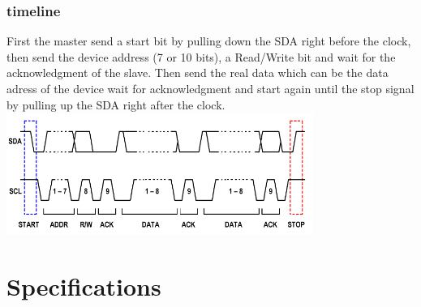 \documentclass[12pt,a4paper,landscape]{article}
\begin{document}
\begin{multicols}{2}
		\subsubsection*{timeline}
		First the master send a start bit by pulling down the SDA right before the clock, then send the device address (7 or 10 bits), a Read/Write bit and wait for the acknowledgment of the slave. Then send the real data which can be the data adress of the device wait for acknowledgment and start again until the stop signal by pulling up the SDA right after the clock. 
		\includegraphics[width=10cm]{i2c.png}

	\end{multicols}
\section*{Specifications}


\vspace{2cm}
\end{document}
